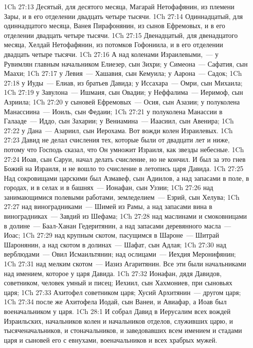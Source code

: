 \vs 1Ch 27:13 Десятый, для десятого месяца, Магарай Нетофафянин, из племени Зары, и в его отделении двадцать четыре тысячи.
\vs 1Ch 27:14 Одиннадцатый, для одиннадцатого месяца, Ванея Пирафонянин, из сынов Ефремовых, и в его отделении двадцать четыре тысячи.
\vs 1Ch 27:15 Двенадцатый, для двенадцатого месяца, Хелдай Нетофафянин, из потомков Гофониила, и в его отделении двадцать четыре тысячи.
\rsbpar\vs 1Ch 27:16 А над коленами Израилевыми,~--- у Рувимлян главным начальником  Елиезер, сын Зихри; у Симеона~--- Сафатия, сын Маахи;
\vs 1Ch 27:17 у Левия~--- Хашавия, сын Кемуила; у Аарона~--- Садок;
\vs 1Ch 27:18 у Иуды~--- Елиав, из братьев Давида; у Иссахара~--- Омри, сын Михаила;
\vs 1Ch 27:19 у Завулона~--- Ишмаия, сын Овадии; у Неффалима~--- Иеримоф, сын Азриила;
\vs 1Ch 27:20 у сыновей Ефремовых~--- Осия, сын Азазии; у полуколена Манассиина~--- Иоиль, сын Федаии;
\vs 1Ch 27:21 у полуколена Манассии в Галааде~--- Иддо, сын Захарии; у Вениамина~--- Иаасиил, сын Авенира;
\vs 1Ch 27:22 у Дана~--- Азариил, сын Иерохама. Вот вожди колен Израилевых.
\vs 1Ch 27:23 Давид не делал счисления тех, которые были от двадцати лет и ниже, потому что Господь сказал, что Он умножит Израиля, как звезды небесные.
\vs 1Ch 27:24 Иоав, сын Саруи, начал делать счисление, но не кончил. И был за это гнев Божий на Израиля, и не вошло то счисление в летопись царя Давида.
\rsbpar\vs 1Ch 27:25 Над сокровищами царскими был Азмавеф, сын Адиилов, а над запасами в поле, в городах, и в селах и в башнях~--- Ионафан, сын Уззии;
\vs 1Ch 27:26 над занимающимися полевыми работами, земледелием~--- Езрий, сын Хелува;
\vs 1Ch 27:27 над виноградниками~--- Шимей из Рамы, а над запасами вина в виноградниках~--- Завдий из Шефама;
\vs 1Ch 27:28 над маслинами и смоковницами в долине~--- Баал-Ханан Гедеритянин, а над запасами деревянного масла~--- Иоас;
\vs 1Ch 27:29 над крупным скотом, пасущимся в Шароне~--- Шитрай Шаронянин, а над скотом в долинах~--- Шафат, сын Адлая;
\vs 1Ch 27:30 над верблюдами~--- Овил Исмаильтянин; над ослицами~--- Иехдия Меронифянин;
\vs 1Ch 27:31 над мелким скотом~--- Иазиз Агаритянин. Все эти были начальниками над имением, которое  у царя Давида.
\rsbpar\vs 1Ch 27:32 Ионафан, дядя Давидов,  советником, человек умный и писец; Иехиил, сын Хахмониев,  при сыновьях царя;
\vs 1Ch 27:33 Ахитофел  советником царя; Хусий Архитянин~--- другом царя;
\vs 1Ch 27:34 после же Ахитофела Иодай, сын Ванеи, и Авиафар, а Иоав был военачальником у царя.
\vs 1Ch 28:1 И собрал Давид в Иерусалим всех вождей Израильских, начальников колен и начальников отделов, служивших царю, и тысяченачальников, и стоначальников, и заведовавших всем имением и стадами царя и сыновей его с евнухами, военачальников и всех храбрых мужей.
